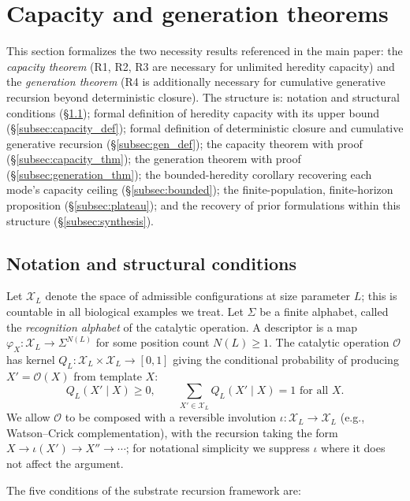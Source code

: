 \documentclass[11pt]{article}
\theoremstyle{plain}
\theoremstyle{definition}
\newcommand{\descX}{\varphi_X}
\newcommand{\Xset}{\mathcal{X}}
\newcommand{\Op}{\mathcal{O}}
\begin{document}
\section{Capacity and generation theorems}
\label{sec:capacity_generation_theorems}

This section formalizes the two necessity results referenced in the main paper: the \emph{capacity theorem} (R1, R2, R3 are necessary for unlimited heredity capacity) and the \emph{generation theorem} (R4 is additionally necessary for cumulative generative recursion beyond deterministic closure). The structure is: notation and structural conditions (§\ref{subsec:conditions}); formal definition of heredity capacity with its upper bound (§\ref{subsec:capacity_def}); formal definition of deterministic closure and cumulative generative recursion (§\ref{subsec:gen_def}); the capacity theorem with proof (§\ref{subsec:capacity_thm}); the generation theorem with proof (§\ref{subsec:generation_thm}); the bounded-heredity corollary recovering each mode's capacity ceiling (§\ref{subsec:bounded}); the finite-population, finite-horizon proposition (§\ref{subsec:plateau}); and the recovery of prior formulations within this structure (§\ref{subsec:synthesis}).

\subsection{Notation and structural conditions}
\label{subsec:conditions}

Let $\Xset_L$ denote the space of admissible configurations at size parameter $L$; this is countable in all biological examples we treat. Let $\Sigma$ be a finite alphabet, called the \emph{recognition alphabet} of the catalytic operation. A descriptor is a map $\descX : \Xset_L \to \Sigma^{N(L)}$ for some position count $N(L) \ge 1$. The catalytic operation $\Op$ has kernel $Q_L : \Xset_L \times \Xset_L \to [0,1]$ giving the conditional probability of producing $X' = \Op(X)$ from template $X$:
\begin{equation}
Q_L(X' \mid X) \ge 0, \qquad \sum_{X' \in \Xset_L} Q_L(X' \mid X) = 1 \text{ for all } X.
\end{equation}
We allow $\Op$ to be composed with a reversible involution $\iota : \Xset_L \to \Xset_L$ (e.g., Watson--Crick complementation), with the recursion taking the form $X \to \iota(X') \to X'' \to \cdots$; for notational simplicity we suppress $\iota$ where it does not affect the argument.

The five conditions of the substrate recursion framework are:
\end{document}
